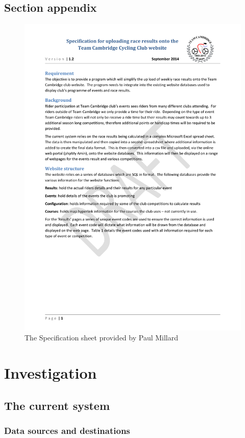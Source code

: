 \subsection{Section appendix}
\begin{figure}[H]
    \includegraphics[width=\textwidth]{./v1-2-Spec for results upload.pdf}
    \caption{The Specification sheet provided by Paul Millard} \label{}
\end{figure}
\section{Investigation}

\subsection{The current system}

\subsubsection{Data sources and destinations}

